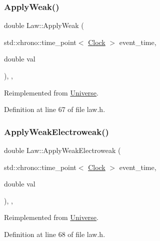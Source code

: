 \subsubsection{\texorpdfstring{Apply\+Weak()}{ApplyWeak()}}
{\footnotesize\ttfamily double Law\+::\+Apply\+Weak (\begin{DoxyParamCaption}\item[{std\+::chrono\+::time\+\_\+point$<$ \hyperlink{universe_8h_a0ef8d951d1ca5ab3cfaf7ab4c7a6fd80}{Clock} $>$}]{event\+\_\+time,  }\item[{double}]{val }\end{DoxyParamCaption})\hspace{0.3cm}{\ttfamily [inline]}, {\ttfamily [final]}, {\ttfamily [virtual]}}



Reimplemented from \hyperlink{class_universe_a6d1226b3adec3c42a833afdbb6a65a92}{Universe}.



Definition at line 67 of file law.\+h.

\mbox{\label{class_law_ae8a5d1d09686d79f7814c8800791460b}} 
\subsubsection{\texorpdfstring{Apply\+Weak\+Electroweak()}{ApplyWeakElectroweak()}}
{\footnotesize\ttfamily double Law\+::\+Apply\+Weak\+Electroweak (\begin{DoxyParamCaption}\item[{std\+::chrono\+::time\+\_\+point$<$ \hyperlink{universe_8h_a0ef8d951d1ca5ab3cfaf7ab4c7a6fd80}{Clock} $>$}]{event\+\_\+time,  }\item[{double}]{val }\end{DoxyParamCaption})\hspace{0.3cm}{\ttfamily [inline]}, {\ttfamily [final]}, {\ttfamily [virtual]}}



Reimplemented from \hyperlink{class_universe_a46a906baabb63e5d31f8b48ea1fae52e}{Universe}.



Definition at line 68 of file law.\+h.

\mbox{\label{class_law_ab30a86ef88a85e13d3e598caa45bff05}} 
